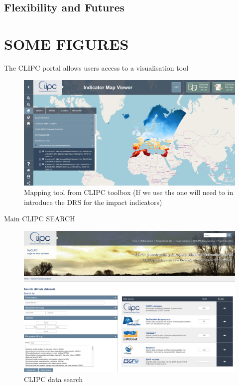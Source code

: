 \documentclass[final,1p,times,twocolumn,authoryear]{elsarticle}
\begin{document}
{{\subsection{Flexibility and Futures}


\section*{SOME FIGURES}

The CLIPC portal allows users access to a visualisation tool 



\begin{figure}
    \centering
    \includegraphics[scale=0.2]{images/c4iportal.png}
    \caption{Mapping tool from CLIPC toolbox (If we use ths one will need to in introduce the DRS for the impact indicators)}
    \label{fig:my_label}
\end{figure}


Main CLIPC SEARCH
\begin{figure}
    \centering
    \includegraphics[scale=0.3]{images/CLIPC-seach.png}
    \caption{CLIPC data search}
    \label{fig:my_label}
\end{figure}


}}
\end{document}

